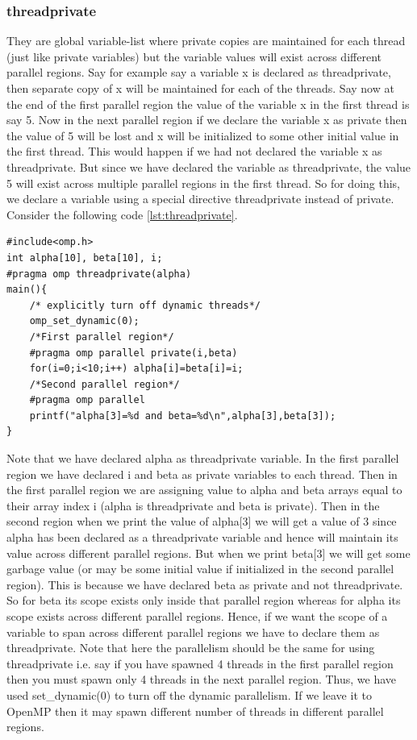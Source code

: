 \documentclass[12pt]{article}
\begin{document}
\subsubsection{threadprivate}
They are global variable-list where private copies are maintained for each thread (just like private variables) but the variable values will exist across different parallel regions. Say for example say a variable x is declared as threadprivate, then separate copy of x will be maintained for each of the threads. Say now at the end of the first parallel region the value of the variable x in the first thread is say 5. Now in the next parallel region if we declare the variable x as private then the value of 5 will be lost and x will be initialized to some other initial value in the first thread. This would happen if we had not declared the variable x as threadprivate. But since we have declared the variable as threadprivate, the value 5 will exist across multiple parallel regions in the first thread. So for doing this, we declare a variable using a special directive threadprivate instead of private. Consider the following code \ref{lst:threadprivate}.
\begin{lstlisting}[caption={threadprivate Directive},captionpos=b,label={lst:threadprivate}]
#include<omp.h>
int alpha[10], beta[10], i;
#pragma omp threadprivate(alpha)
main(){
    /* explicitly turn off dynamic threads*/
    omp_set_dynamic(0);
    /*First parallel region*/
    #pragma omp parallel private(i,beta)
    for(i=0;i<10;i++) alpha[i]=beta[i]=i;
    /*Second parallel region*/
    #pragma omp parallel
    printf("alpha[3]=%d and beta=%d\n",alpha[3],beta[3]);
}
\end{lstlisting}
Note that we have declared alpha as threadprivate variable.
In the first parallel region we have declared i and beta as private variables to each thread.  Then in the first parallel region we are assigning value to alpha and beta arrays equal to their array index i (alpha is threadprivate and beta is private).
Then in the second region when we print the value of alpha[3] we will get a value of 3 since alpha has been declared as a threadprivate variable and hence will maintain its value across different parallel regions. But when we print beta[3] we will get some garbage value (or may be some initial value if initialized in the second parallel region). This is because we have declared beta as private and not threadprivate. So for beta its scope exists only inside that parallel region whereas for alpha its scope exists across different parallel regions. Hence, if we want the scope of a variable to span across different parallel regions we have to declare them as threadprivate. Note that here the parallelism should be the same for using threadprivate i.e. say if you have spawned 4 threads in the first parallel region then you must spawn only 4 threads in the next parallel region. Thus, we have used set\_dynamic(0) to turn off the dynamic parallelism. If we leave it to OpenMP then it may spawn different number of threads in different parallel regions.
\end{document}

